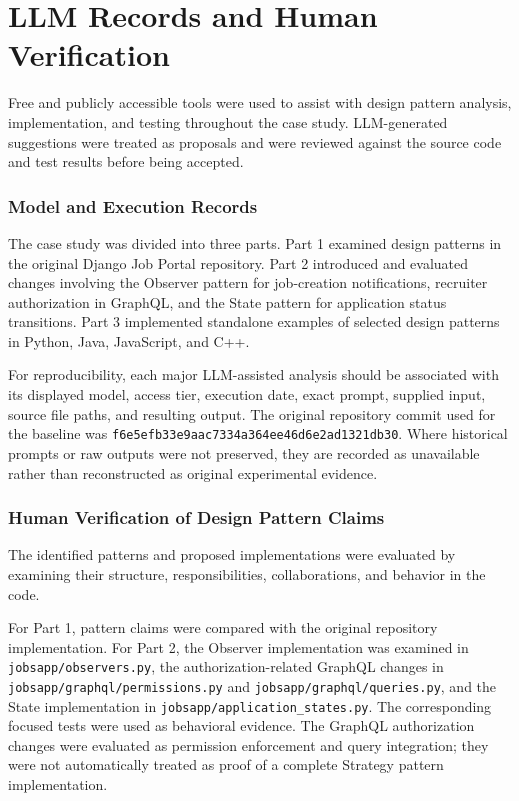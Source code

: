 \documentclass[11pt,a4paper]{article}
\begin{document}
\appendix
\section{LLM Records and Human Verification}

Free and publicly accessible tools were used to assist with
design pattern analysis, implementation, and testing throughout
the case study. LLM-generated suggestions were treated as
proposals and were reviewed against the source code and test
results before being accepted.

\subsubsection{Model and Execution Records}

The case study was divided into three parts. Part 1 examined
design patterns in the original Django Job Portal repository.
Part 2 introduced and evaluated changes involving the Observer
pattern for job-creation notifications, recruiter authorization
in GraphQL, and the State pattern for application status
transitions. Part 3 implemented standalone examples of selected
design patterns in Python, Java, JavaScript, and C++.

For reproducibility, each major LLM-assisted analysis should
be associated with its displayed model, access tier, execution
date, exact prompt, supplied input, source file paths, and
resulting output. The original repository commit used for the
baseline was
\texttt{f6e5efb33e9aac7334a364ee46d6e2ad1321db30}.
Where historical prompts or raw outputs were not preserved,
they are recorded as unavailable rather than reconstructed
as original experimental evidence.

\subsubsection{Human Verification of Design Pattern Claims}

The identified patterns and proposed implementations were
evaluated by examining their structure, responsibilities,
collaborations, and behavior in the code.

For Part 1, pattern claims were compared with the original
repository implementation. For Part 2, the Observer
implementation was examined in
\texttt{jobsapp/observers.py}, the authorization-related
GraphQL changes in
\texttt{jobsapp/graphql/permissions.py} and
\texttt{jobsapp/graphql/queries.py}, and the State
implementation in \texttt{jobsapp/application\_states.py}.
The corresponding focused tests were used as behavioral
evidence. The GraphQL authorization changes were evaluated
as permission enforcement and query integration; they were
not automatically treated as proof of a complete Strategy
pattern implementation.
\end{document}

